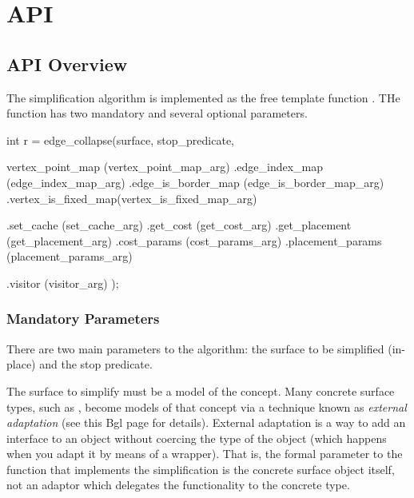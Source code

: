 \section{API}

\subsection{API Overview}

The simplification algorithm is implemented as the free template function 
. THe function has two mandatory and several optional parameters.

\begin{cprog}
int r = edge_collapse(surface,
                     stop_predicate,
                     
                     vertex_point_map   (vertex_point_map_arg)
                     .edge_index_map     (edge_index_map_arg)
                     .edge_is_border_map (edge_is_border_map_arg)
                     .vertex_is_fixed_map(vertex_is_fixed_map_arg)
                     
                     .set_cache          (set_cache_arg)
                     .get_cost           (get_cost_arg)
                     .get_placement      (get_placement_arg)
                     .cost_params        (cost_params_arg)
                     .placement_params   (placement_params_arg)
                     
                     .visitor            (visitor_arg)
                     );
\end{cprog}

\subsubsection{Mandatory Parameters}

There are two main parameters to the algorithm: the surface to be simplified (in-place) and the stop predicate.

The surface to simplify must be a model of the  concept. 
Many concrete surface types, such as , become models of 
that concept via a technique known as 
{\em external adaptation} 
(see 
{this {\sc Bgl} page for details}). External adaptation is a way to add an interface to an 
object without coercing the type of the object (which happens when you adapt it by means 
of a wrapper). That is, the formal parameter to the  function that 
implements the simplification is the concrete surface object itself, not an adaptor 
which delegates the functionality to the concrete type.

